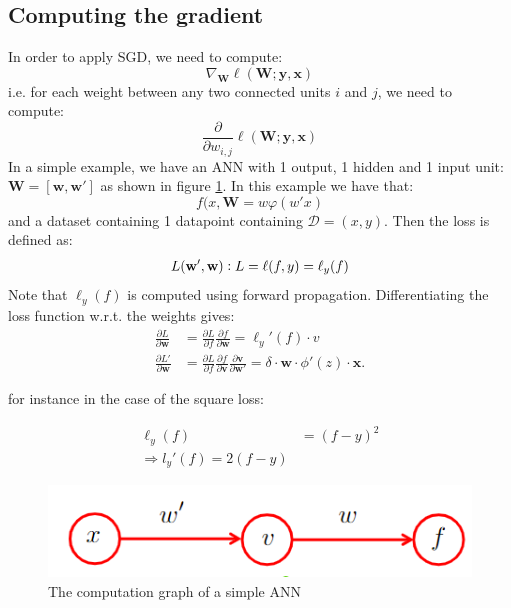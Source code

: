 \documentclass[a4paper,10pt,twoside]{article}
\begin{document}
\subsection{Computing the gradient}
In order to apply SGD, we need to compute:
\begin{equation*}
    \nabla_{\mathbf{W}}\ell(\mathbf{W};\mathbf{y},\mathbf{x})
\end{equation*}
i.e. for each weight between any two connected units $i$ and $j$, we need to compute:
\begin{equation*}
    \frac{\partial}{\partial w_{i,j}}\ell(\mathbf{W};\mathbf{y},\mathbf{x})
\end{equation*}
In a simple example, we have an ANN with 1 output, 1 hidden and 1 input unit: $\mathbf{W}=[\mathbf{w},\mathbf{w}']$ as shown in figure \ref{simple_ann_differentiation_example}. In this example we have that:
\begin{equation*}
    f(x,\mathbf{W}=w\varphi(w'x)
\end{equation*}
and a dataset containing 1 datapoint containing $\mathcal{D}={(x,y)}$. Then the loss is defined as:
\begin{equation*}
    L(\mathbf{w}',\mathbf{w}) \vcentcolon L = \ell(f,y)=\ell_y(f)
\end{equation*}
Note that $\ell_y(f)$ is computed using forward propagation. Differentiating the loss function w.r.t. the weights gives:
\begin{align*}
    \frac{\partial L}{\partial \mathbf{w}}&=\frac{\partial L}{\partial f}\frac{\partial f}{\partial \mathbf{w}}=\ell_y'(f)\cdot v\\
    \frac{\partial L'}{\partial \mathbf{w}}&=\frac{\partial L}{\partial f}\frac{\partial f}{\partial \mathbf{v}}\frac{\partial \mathbf{v}}{\partial \mathbf{w}'}=\delta\cdot\mathbf{w}\cdot\phi'(z)\cdot \mathbf{x}.
\end{align*}

for instance in the case of the square loss:

\begin{align*}
    \ell_{y}(f)&=(f-y)^2\\
    \Rightarrow l_y'(f)=2(f-y)
\end{align*}

\begin{figure}
    \centering
    \includegraphics[width=.5\textwidth]{figures/simple_ann_differentiation_example.png}
    \caption{The computation graph of a simple ANN}
    \label{simple_ann_differentiation_example}
\end{figure}
\end{document}
